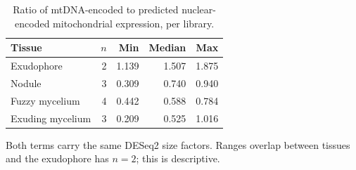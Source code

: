 \begin{table}[htbp]
\caption{Ratio of mtDNA-encoded to predicted nuclear-encoded mitochondrial expression, per library.}\label{tab:retro}
\footnotesize
\begin{tabular}{@{}lrrrr@{}}
\toprule
Tissue & $n$ & Min & Median & Max \\
\midrule
Exudophore & 2 & 1.139 & 1.507 & 1.875 \\
Nodule & 3 & 0.309 & 0.740 & 0.940 \\
Fuzzy mycelium & 4 & 0.442 & 0.588 & 0.784 \\
Exuding mycelium & 3 & 0.209 & 0.525 & 1.016 \\
\bottomrule
\end{tabular}
\begin{tablenotes}[flushleft]\footnotesize\item Both terms carry the same DESeq2 size factors. Ranges overlap between tissues and the exudophore has $n=2$; this is descriptive.\end{tablenotes}
\end{table}
